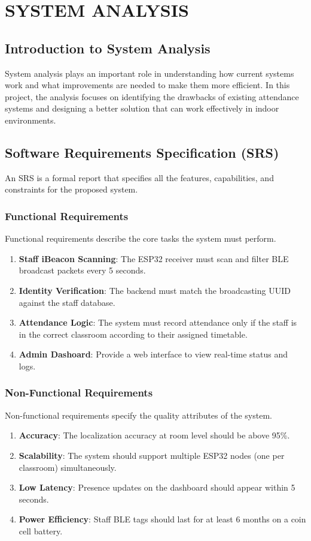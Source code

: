 \chapter{SYSTEM ANALYSIS}

\section{Introduction to System Analysis}
System analysis plays an important role in understanding how current systems work and what improvements are needed to make them more efficient. In this project, the analysis focuses on identifying the drawbacks of existing attendance systems and designing a better solution that can work effectively in indoor environments.

\section{Software Requirements Specification (SRS)}
An SRS is a formal report that specifies all the features, capabilities, and constraints for the proposed system.

\subsection{Functional Requirements}
Functional requirements describe the core tasks the system must perform.
\begin{enumerate}
    \item \textbf{Staff iBeacon Scanning}: The ESP32 receiver must scan and filter BLE broadcast packets every 5 seconds.
    \item \textbf{Identity Verification}: The backend must match the broadcasting UUID against the staff database.
    \item \textbf{Attendance Logic}: The system must record attendance only if the staff is in the correct classroom according to their assigned timetable.
    \item \textbf{Admin Dashoard}: Provide a web interface to view real-time status and logs.
\end{enumerate}

\subsection{Non-Functional Requirements}
Non-functional requirements specify the quality attributes of the system.
\begin{enumerate}
    \item \textbf{Accuracy}: The localization accuracy at room level should be above 95\%.
    \item \textbf{Scalability}: The system should support multiple ESP32 nodes (one per classroom) simultaneously.
    \item \textbf{Low Latency}: Presence updates on the dashboard should appear within 5 seconds.
    \item \textbf{Power Efficiency}: Staff BLE tags should last for at least 6 months on a coin cell battery.
\end{enumerate}

